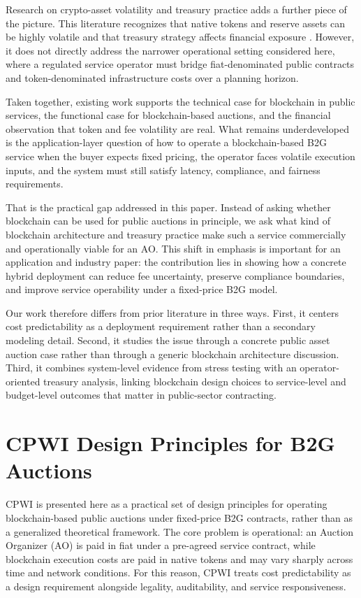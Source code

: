 \documentclass[runningheads]{llncs}
\begin{document}
Research on crypto-asset volatility and treasury practice adds a further piece of the picture. This literature recognizes that native tokens and reserve assets can be highly volatile and that treasury strategy affects financial exposure \cite{ref_BitcoinVolatility2021,ref_CryptoPortfolio2020,ref_MicroStrategy2025,ref_ReserveAsset2025}. However, it does not directly address the narrower operational setting considered here, where a regulated service operator must bridge fiat-denominated public contracts and token-denominated infrastructure costs over a planning horizon.

Taken together, existing work supports the technical case for blockchain in public services, the functional case for blockchain-based auctions, and the financial observation that token and fee volatility are real. What remains underdeveloped is the application-layer question of how to operate a blockchain-based B2G service when the buyer expects fixed pricing, the operator faces volatile execution inputs, and the system must still satisfy latency, compliance, and fairness requirements.

That is the practical gap addressed in this paper. Instead of asking whether blockchain can be used for public auctions in principle, we ask what kind of blockchain architecture and treasury practice make such a service commercially and operationally viable for an AO. This shift in emphasis is important for an application and industry paper: the contribution lies in showing how a concrete hybrid deployment can reduce fee uncertainty, preserve compliance boundaries, and improve service operability under a fixed-price B2G model.

Our work therefore differs from prior literature in three ways. First, it centers cost predictability as a deployment requirement rather than a secondary modeling detail. Second, it studies the issue through a concrete public asset auction case rather than through a generic blockchain architecture discussion. Third, it combines system-level evidence from stress testing with an operator-oriented treasury analysis, linking blockchain design choices to service-level and budget-level outcomes that matter in public-sector contracting.

\section{CPWI Design Principles for B2G Auctions}

CPWI is presented here as a practical set of design principles for operating
blockchain-based public auctions under fixed-price B2G contracts, rather than as
a generalized theoretical framework. The core problem is operational: an Auction Organizer
(AO) is paid in fiat under a pre-agreed service contract, while blockchain
execution costs are paid in native tokens and may vary sharply across time and
network conditions. For this reason, CPWI treats cost predictability as a design
requirement alongside legality, auditability, and service responsiveness.
\end{document}

